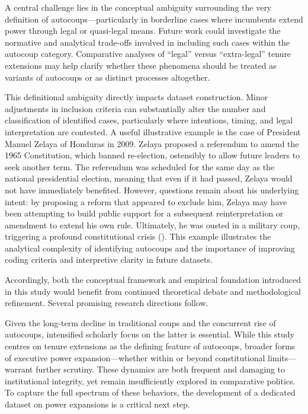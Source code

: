 \documentclass[
  12pt,
]{report}
\begin{document}
A central challenge lies in the conceptual ambiguity surrounding the
very definition of autocoups---particularly in borderline cases where
incumbents extend power through legal or quasi-legal means. Future work
could investigate the normative and analytical trade-offs involved in
including such cases within the autocoup category. Comparative analyses
of ``legal'' versus ``extra-legal'' tenure extensions may help clarify
whether these phenomena should be treated as variants of autocoups or as
distinct processes altogether.

This definitional ambiguity directly impacts dataset construction. Minor
adjustments in inclusion criteria can substantially alter the number and
classification of identified cases, particularly where intentions,
timing, and legal interpretation are contested. A useful illustrative
example is the case of President Manuel Zelaya of Honduras in 2009.
Zelaya proposed a referendum to amend the 1965 Constitution, which
banned re-election, ostensibly to allow future leaders to seek another
term. The referendum was scheduled for the same day as the national
presidential election, meaning that even if it had passed, Zelaya would
not have immediately benefited. However, questions remain about his
underlying intent: by proposing a reform that appeared to exclude him,
Zelaya may have been attempting to build public support for a subsequent
reinterpretation or amendment to extend his own rule. Ultimately, he was
ousted in a military coup, triggering a profound constitutional crisis
(). This example illustrates the analytical complexity of
identifying autocoups and the importance of improving coding criteria
and interpretive clarity in future datasets.

Accordingly, both the conceptual framework and empirical foundation
introduced in this study would benefit from continued theoretical debate
and methodological refinement. Several promising research directions
follow.

Given the long-term decline in traditional coups and the concurrent rise
of autocoups, intensified scholarly focus on the latter is essential.
While this study centres on tenure extensions as the defining feature of
autocoups, broader forms of executive power expansion---whether within
or beyond constitutional limits---warrant further scrutiny. These
dynamics are both frequent and damaging to institutional integrity, yet
remain insufficiently explored in comparative politics. To capture the
full spectrum of these behaviors, the development of a dedicated dataset
on power expansions is a critical next step.
\end{document}
